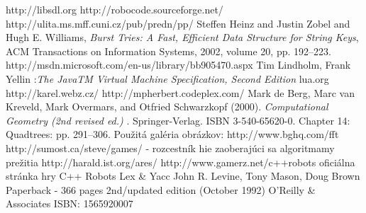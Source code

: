 \documentclass[12pt,notitlepage]{report}
\begin{document}
\begin{thebibliography}{99}
 http://libsdl.org
 http://robocode.sourceforge.net/
 http://ulita.ms.mff.cuni.cz/pub/predn/pp/
Steffen Heinz and Justin Zobel and Hugh E. Williams,
    \emph{Burst Tries: A Fast, Efficient Data Structure for String Keys},
    ACM Transactions on Information Systems, 2002,
    volume 20, pp. 192--223.
 http://msdn.microsoft.com/en-us/library/bb905470.aspx
 Tim Lindholm, Frank Yellin :\emph{The JavaTM Virtual Machine Specification, Second Edition}
 lua.org
 http://karel.webz.cz/
http://mpherbert.codeplex.com/
   Mark de Berg, Marc van Kreveld, Mark Overmars, and Otfried Schwarzkopf (2000). \emph{ Computational Geometry (2nd revised ed.) }. Springer-Verlag. ISBN 3-540-65620-0.  Chapter 14: Quadtrees: pp. 291–306.
 Použitá galéria obrázkov: http://www.bghq.com/fft 
 http://sumost.ca/steve/games/ - rozcestník hie zaoberajúci sa algoritmamy prežitia
http://harald.ist.org/ares/ 
 http://www.gamerz.net/c++robots oficiálna stránka hry C++ Robots
Lex \& Yacc John R. Levine, Tony Mason, Doug Brown Paperback - 366 pages 2nd/updated edition (October 1992) O'Reilly \& Associates
ISBN: 1565920007
\end{thebibliography}
\appendix
\end{document}

